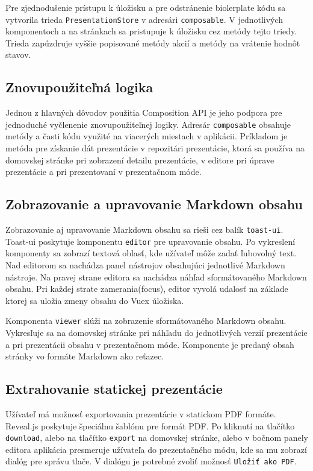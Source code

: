Pre zjednodušenie prístupu k úložisku a pre odstránenie biolerplate kódu sa vytvorila trieda \texttt{PresentationStore} v adresári \texttt{composable}. V jednotlivých komponentoch a na stránkach sa pristupuje k úložisku cez metódy tejto triedy. Trieda zapúzdruje vyššie popisované metódy akcií a metódy na vrátenie hodnôt stavov.

\subsection{Znovupoužiteľná logika}
Jednou z hlavných dôvodov použitia Composition API je jeho podpora pre jednoduché vyčlenenie znovupoužiteľnej logiky. Adresár \texttt{composable} obsahuje metódy a časti kódu využité na viacerých miestach v aplikácii. Príkladom je metóda pre získanie dát prezentácie v repozitári prezentácie, ktorá sa používa na domovskej stránke pri zobrazení detailu prezentácie, v editore pri úprave prezentácie a pri prezentovaní v prezentačnom móde. 

\subsection{Zobrazovanie a upravovanie Markdown obsahu}
Zobrazovanie aj upravovanie Markdown obsahu sa rieši cez balík \texttt{toast-ui}. Toast-ui poskytuje komponentu \texttt{editor} pre upravovanie obsahu. Po vykreslení komponenty sa zobrazí textová oblasť, kde užívateľ môže zadať ľubovolný text. Nad editorom sa nachádza panel nástrojov obsahujúci jednotlivé Markdown nástroje. Na pravej strane editora sa nachádza náhľad sformátovaného Markdown obsahu. Pri každej strate zamerania(focus), editor vyvolá udalosť na základe ktorej sa uložia zmeny obsahu do Vuex úložiska. 

Komponenta \texttt{viewer} slúži na zobrazenie sformátovaného Markdown obsahu. Vykresľuje sa na domovskej stránke pri náhľadu do jednotlivých verzií prezentácie a pri prezentácii obsahu v prezentačnom móde. Komponente je predaný obsah stránky vo formáte Markdown ako reťazec.

\subsection{Extrahovanie statickej prezentácie}
Užívateľ má možnosť exportovania prezentácie v statickom PDF formáte. Reveal.js poskytuje špeciálnu šablónu pre formát PDF. Po kliknutí na tlačítko \texttt{download}, alebo na tlačítko \texttt{export} na domovskej stránke, alebo v bočnom panely editora aplikácia presmeruje užívateľa do prezentačného módu, kde sa mu zobrazí dialóg pre správu tlače. V dialógu je potrebné zvoliť možnosť \texttt{Uložiť ako PDF}.


